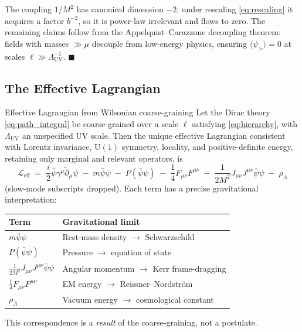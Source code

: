 \documentclass[11pt,a4paper]{article}
\theoremstyle{definition}
\theoremstyle{remark}
\begin{document}
		The coupling $1/M^2$ has canonical dimension $-2$; under rescaling
		\eqref{eq:rescaling} it acquires a factor $b^{-2}$, so it is power-law
		irrelevant and flows to zero.  The remaining claims follow from the
		Appelquist--Carazzone decoupling theorem: fields with masses
		$\gg \mu$ decouple from low-energy physics, ensuring
		$\langle\psi_{>}\rangle = 0$ at scales $\ell \gg \Lambda_{\mathrm{UV}}^{-1}$.
		\hfill$\blacksquare$
	
	\subsection{The Effective Lagrangian}
	
	Effective Lagrangian from Wilsonian coarse-graining
		\label{thm:Leff}
		Let the Dirac theory \eqref{eq:path_integral} be coarse-grained over a scale
		$\ell$ satisfying \eqref{eq:hierarchy}, with $\Lambda_{\mathrm{UV}}$ an
		unspecified UV scale.  Then the unique effective Lagrangian consistent with
		Lorentz invariance, $\mathrm{U}(1)$ symmetry, locality, and positive-definite
		energy, retaining only marginal and relevant operators, is
		\begin{equation}
			\boxed{
				\mathcal{L}_{\mathrm{eff}}
				\;=\;\frac{i}{2}\bar{\psi}\gamma^\mu\overleftrightarrow{\partial}_\mu\psi
				\;-\; m\bar{\psi}\psi
				\;-\; P(\bar{\psi}\psi)
				\;-\; \frac{1}{4}F_{\mu\nu}F^{\mu\nu}
				\;-\; \frac{1}{2M^2}J_{\mu\nu}J^{\mu\nu}\bar{\psi}\psi
				\;-\; \rho_\Lambda
			}
			\label{eq:Leff_final}
		\end{equation}
		(slow-mode subscripts dropped).  Each term has a precise gravitational
		interpretation:
		\begin{center}
			\begin{tabular}{ll}
				\hline
				\textbf{Term} & \textbf{Gravitational limit} \\
				\hline
				$m\bar{\psi}\psi$
				& Rest-mass density $\to$ Schwarzschild \\
				$P(\bar{\psi}\psi)$
				& Pressure $\to$ equation of state \\
				$\tfrac{1}{2M^2}J_{\mu\nu}J^{\mu\nu}\bar{\psi}\psi$
				& Angular momentum $\to$ Kerr frame-dragging \\
				$\tfrac{1}{4}F_{\mu\nu}F^{\mu\nu}$
				& EM energy $\to$ Reissner--Nordstr\"om \\
				$\rho_\Lambda$
				& Vacuum energy $\to$ cosmological constant \\
				\hline
			\end{tabular}
		\end{center}
		This correspondence is a \emph{result} of the coarse-graining, not a postulate.
	
\end{document}
